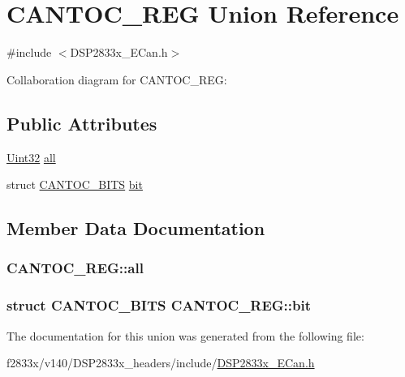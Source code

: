 \hypertarget{union_c_a_n_t_o_c___r_e_g}{}\section{C\+A\+N\+T\+O\+C\+\_\+\+R\+E\+G Union Reference}
\label{union_c_a_n_t_o_c___r_e_g}


{\ttfamily \#include $<$D\+S\+P2833x\+\_\+\+E\+Can.\+h$>$}



Collaboration diagram for C\+A\+N\+T\+O\+C\+\_\+\+R\+E\+G\+:
\subsection*{Public Attributes}
\begin{DoxyCompactItemize}
\item 
\hyperlink{_d_s_p2833x___device_8h_aba99025e657f892beb7ff31cecf64653}{Uint32} \hyperlink{union_c_a_n_t_o_c___r_e_g_a131f915c29c98744a994c05b375a6e08}{all}
\item 
struct \hyperlink{struct_c_a_n_t_o_c___b_i_t_s}{C\+A\+N\+T\+O\+C\+\_\+\+B\+I\+T\+S} \hyperlink{union_c_a_n_t_o_c___r_e_g_aa117d51b2af547128748131405f27d10}{bit}
\end{DoxyCompactItemize}


\subsection{Member Data Documentation}
\hypertarget{union_c_a_n_t_o_c___r_e_g_a131f915c29c98744a994c05b375a6e08}{}
\subsubsection[{all}]{ C\+A\+N\+T\+O\+C\+\_\+\+R\+E\+G\+::all}\label{union_c_a_n_t_o_c___r_e_g_a131f915c29c98744a994c05b375a6e08}
\hypertarget{union_c_a_n_t_o_c___r_e_g_aa117d51b2af547128748131405f27d10}{}
\subsubsection[{bit}]{\setlength{\rightskip}{0pt plus 5cm}struct {\bf C\+A\+N\+T\+O\+C\+\_\+\+B\+I\+T\+S} C\+A\+N\+T\+O\+C\+\_\+\+R\+E\+G\+::bit}\label{union_c_a_n_t_o_c___r_e_g_aa117d51b2af547128748131405f27d10}


The documentation for this union was generated from the following file\+:\begin{DoxyCompactItemize}
\item 
f2833x/v140/\+D\+S\+P2833x\+\_\+headers/include/\hyperlink{_d_s_p2833x___e_can_8h}{D\+S\+P2833x\+\_\+\+E\+Can.\+h}\end{DoxyCompactItemize}
